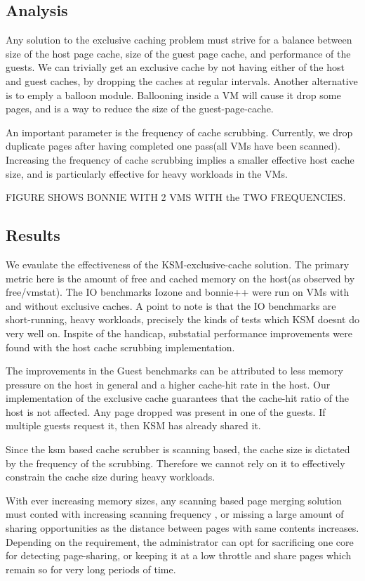 \documentclass[10pt,a4paper]{article}
\begin{document}
\subsection{Analysis}

Any solution to the exclusive caching problem must strive for a balance between size of the host page cache, size of the guest page cache, and performance of the guests. 
We can trivially get an exclusive cache by not having either of the host and guest caches, by dropping the caches at regular intervals.
Another alternative is to emply a balloon module. Ballooning inside a VM will cause it drop some pages, and is a way to reduce the size of the guest-page-cache.

An important parameter is the frequency of cache scrubbing. Currently, we drop duplicate pages after having completed one pass(all VMs have been scanned). Increasing the frequency of cache scrubbing implies a smaller effective host cache size, and is particularly effective for heavy workloads in the VMs.

FIGURE SHOWS BONNIE WITH 2 VMS WITH the TWO FREQUENCIES.

\subsection{Results}
We evaulate the effectiveness of the KSM-exclusive-cache solution. The primary metric here is the amount of free and cached memory on the host(as observed by free/vmstat). 
The IO benchmarks Iozone and bonnie++ were run on VMs with and without exclusive caches. 
A point to note is that the IO benchmarks are short-running, heavy workloads, precisely the kinds of tests which KSM doesnt do very well on. Inspite of the handicap, substatial performance improvements were found with the host cache scrubbing implementation. 

The improvements in the Guest benchmarks can be attributed to less memory pressure on the host in general and a higher cache-hit rate in the host. 
Our implementation of the exclusive cache guarantees that the cache-hit ratio of the host is not affected. Any page dropped was present in one of the guests. If multiple guests request it, then KSM has already shared it. 

Since the ksm based cache scrubber is scanning based, the cache size is dictated by the frequency of the scrubbing. Therefore we cannot rely on it to effectively constrain the cache size during heavy workloads. 

With ever increasing memory sizes, any scanning based page merging solution must conted with increasing scanning frequency , or missing a large amount of sharing opportunities as the distance between pages with same contents increases. Depending on the requirement, the administrator can opt for sacrificing one core for detecting page-sharing, or keeping it at a low throttle and share pages which remain so for very long periods of time. 
\end{document}
